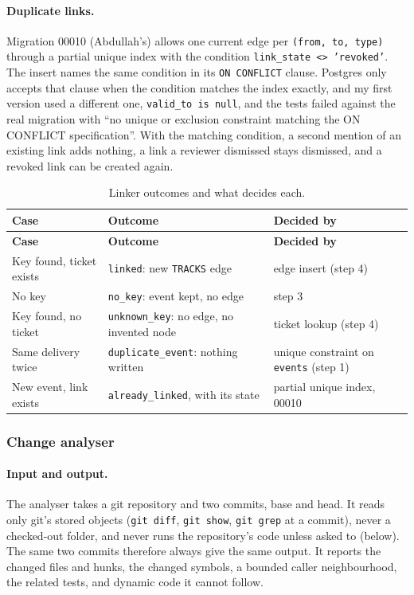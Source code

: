 \paragraph{Duplicate links.} Migration 00010 (Abdullah's) allows one current
edge per \texttt{(from, to, type)} through a partial unique index with the
condition \texttt{link\_\allowbreak{}state <> 'revoked'}. The insert names the same
condition in its \texttt{ON CONFLICT} clause. Postgres only accepts that clause
when the condition matches the index exactly, and my first version used a
different one, \texttt{valid\_\allowbreak{}to is null}, and the tests failed against the real
migration with ``no unique or exclusion constraint matching the ON CONFLICT
specification''. With the matching condition, a second mention of an existing
link adds nothing, a link a reviewer dismissed stays dismissed, and a revoked
link can be created again.

\begin{longtable}{>{\raggedright\arraybackslash}p{} >{\raggedright\arraybackslash}p{} >{\raggedright\arraybackslash}p{}}
\caption{Linker outcomes and what decides each.}\label{tab:linker-outcomes}\\
\hline\textbf{Case} & \textbf{Outcome} & \textbf{Decided by} \\
\hline\endfirsthead
\hline\textbf{Case} & \textbf{Outcome} & \textbf{Decided by} \\
\hline\endhead
Key found, ticket exists & \texttt{linked}: new \texttt{TRACKS} edge & edge insert (step 4) \\
No key & \texttt{no\_key}: event kept, no edge & step 3 \\
Key found, no ticket & \texttt{unknown\_key}: no edge, no invented node & ticket lookup (step 4) \\
Same delivery twice & \texttt{duplicate\_event}: nothing written & unique constraint on \texttt{events} (step 1) \\
New event, link exists & \texttt{already\_linked}, with its state & partial unique index, 00010 \\
\hline\end{longtable}

\subsubsection{Change analyser}

\paragraph{Input and output.} The analyser takes a git repository and two
commits, base and head. It reads only git's stored objects
(\texttt{git diff}, \texttt{git show}, \texttt{git grep} at a commit), never a
checked-out folder, and never runs the repository's code unless asked to
(below). The same two commits therefore always give the same output. It
reports the changed files and hunks, the changed symbols, a bounded caller
neighbourhood, the related tests, and dynamic code it cannot follow.

